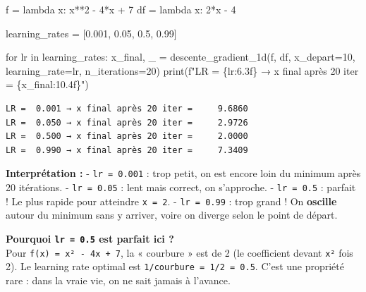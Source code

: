 \documentclass[
  french,
  11pt,
  a4paper,
]{scrbook}
\newenvironment{Shaded}{}{}
\newcommand{\BuiltInTok}[1]{\textcolor[rgb]{0.84,0.23,0.29}{#1}}
\newcommand{\ControlFlowTok}[1]{\textcolor[rgb]{0.84,0.23,0.29}{#1}}
\newcommand{\DecValTok}[1]{\textcolor[rgb]{0.00,0.36,0.77}{#1}}
\newcommand{\FloatTok}[1]{\textcolor[rgb]{0.00,0.36,0.77}{#1}}
\newcommand{\KeywordTok}[1]{\textcolor[rgb]{0.84,0.23,0.29}{#1}}
\newcommand{\NormalTok}[1]{\textcolor[rgb]{0.14,0.16,0.18}{#1}}
\newcommand{\OperatorTok}[1]{\textcolor[rgb]{0.14,0.16,0.18}{#1}}
\newcommand{\SpecialCharTok}[1]{\textcolor[rgb]{0.00,0.36,0.77}{#1}}
\newcommand{\SpecialStringTok}[1]{\textcolor[rgb]{0.01,0.18,0.38}{#1}}
\begin{document}
\begin{tcolorbox}[enhanced jigsaw, arc=.35mm, bottomrule=.15mm, bottomtitle=1mm, breakable, colback=white, colbacktitle=quarto-callout-tip-color!10!white, colframe=quarto-callout-tip-color-frame, coltitle=black, left=2mm, leftrule=.75mm, opacityback=0, opacitybacktitle=0.6, rightrule=.15mm, title=\textcolor{quarto-callout-tip-color}{\faLightbulb}\hspace{0.5em}{✅ Voir la correction}, titlerule=0mm, toprule=.15mm, toptitle=1mm]

\begin{Shaded}
\begin{Highlighting}[]
\NormalTok{f }\OperatorTok{=} \KeywordTok{lambda}\NormalTok{ x: x}\OperatorTok{**}\DecValTok{2} \OperatorTok{{-}} \DecValTok{4}\OperatorTok{*}\NormalTok{x }\OperatorTok{+} \DecValTok{7}
\NormalTok{df }\OperatorTok{=} \KeywordTok{lambda}\NormalTok{ x: }\DecValTok{2}\OperatorTok{*}\NormalTok{x }\OperatorTok{{-}} \DecValTok{4}

\NormalTok{learning\_rates }\OperatorTok{=}\NormalTok{ [}\FloatTok{0.001}\NormalTok{, }\FloatTok{0.05}\NormalTok{, }\FloatTok{0.5}\NormalTok{, }\FloatTok{0.99}\NormalTok{]}

\ControlFlowTok{for}\NormalTok{ lr }\KeywordTok{in}\NormalTok{ learning\_rates:}
\NormalTok{    x\_final, \_ }\OperatorTok{=}\NormalTok{ descente\_gradient\_1d(f, df, x\_depart}\OperatorTok{=}\DecValTok{10}\NormalTok{, learning\_rate}\OperatorTok{=}\NormalTok{lr, n\_iterations}\OperatorTok{=}\DecValTok{20}\NormalTok{)}
    \BuiltInTok{print}\NormalTok{(}\SpecialStringTok{f"LR = }\SpecialCharTok{\{}\NormalTok{lr}\SpecialCharTok{:6.3f\}}\SpecialStringTok{ → x final après 20 iter = }\SpecialCharTok{\{}\NormalTok{x\_final}\SpecialCharTok{:10.4f\}}\SpecialStringTok{"}\NormalTok{)}
\end{Highlighting}
\end{Shaded}

\begin{verbatim}
LR =  0.001 → x final après 20 iter =     9.6860
LR =  0.050 → x final après 20 iter =     2.9726
LR =  0.500 → x final après 20 iter =     2.0000
LR =  0.990 → x final après 20 iter =     7.3409
\end{verbatim}

\textbf{Interprétation :} - \texttt{lr\ =\ 0.001} : trop petit, on est
encore loin du minimum après 20 itérations. - \texttt{lr\ =\ 0.05} :
lent mais correct, on s'approche. - \texttt{lr\ =\ 0.5} : parfait ! Le
plus rapide pour atteindre \texttt{x\ =\ 2}. - \texttt{lr\ =\ 0.99} :
trop grand ! On \textbf{oscille} autour du minimum sans y arriver, voire
on diverge selon le point de départ.

\textbf{Pourquoi \texttt{lr\ =\ 0.5} est parfait ici ?}\\
Pour \texttt{f(x)\ =\ x²\ -\ 4x\ +\ 7}, la « courbure » est de 2 (le
coefficient devant \texttt{x²} fois 2). Le learning rate optimal est
\texttt{1/courbure\ =\ 1/2\ =\ 0.5}. C'est une propriété rare : dans la
vraie vie, on ne sait jamais à l'avance.

\end{tcolorbox}
\end{document}

